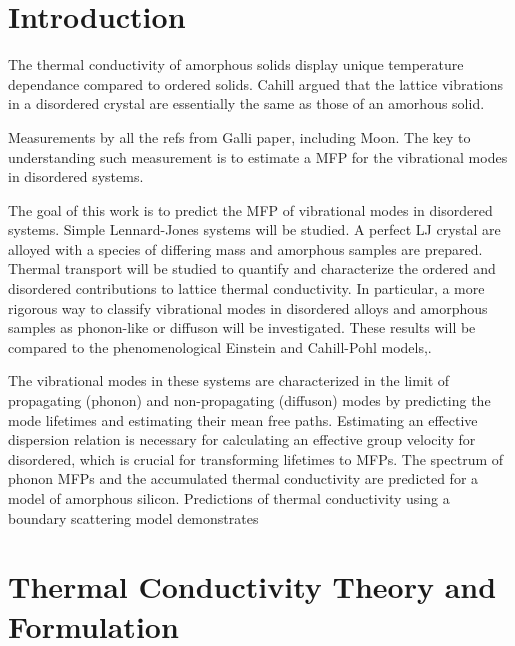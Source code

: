 \documentclass[aps,prb,preprint,superscriptaddress,amsmath,amssymb,floatfix]{revtex4}
\begin{document}
\section{\label{S:Introduction}Introduction}
The thermal conductivity of amorphous solids display 
unique temperature dependance compared to ordered solids.
\cite{freeman_thermal_1986} 
Cahill argued that the lattice vibrations 
in a disordered crystal are essentially the same as those of an amorhous 
solid.
\cite{cahill_lower_1992} 

Measurements by all the refs from Galli paper, including Moon.
\cite{wada_thermal_1996,zink_thermal_2006,yang_anomalously_2010,
cahill_thermal_1994,kuo_thermal_1992,moon_thermal_2002,liu_high_2009}
The key to understanding such measurement is to estimate a MFP for the 
vibrational modes in disordered systems. 

The goal of this work is to predict the MFP of vibrational modes in 
disordered systems. Simple Lennard-Jones systems will be studied.  A 
perfect LJ crystal are alloyed with a species of differing mass and 
amorphous samples are prepared. Thermal transport will be studied to 
quantify and characterize the ordered and 
disordered contributions to lattice thermal conductivity. In particular, a 
more rigorous way to classify vibrational modes in disordered alloys and 
amorphous samples as phonon-like or diffuson will be investigated. These 
results will be compared to the phenomenological Einstein and Cahill-Pohl 
models,\cite{einstein1911,kittel1949,cahill1992}.

The vibrational modes in these systems are
characterized in the limit of propagating (phonon) and 
non-propagating (diffuson) modes by predicting the mode lifetimes and 
estimating their mean free paths. Estimating an effective dispersion
relation is necessary for calculating an effective group velocity for 
disordered, which is crucial for transforming lifetimes to MFPs.
The spectrum of phonon MFPs and the accumulated thermal conductivity 
are predicted for a model of amorphous silicon. Predictions of thermal 
conductivity using a boundary scattering model demonstrates  


\section{\label{S:Theory}Thermal Conductivity Theory and Formulation}
\end{document}
